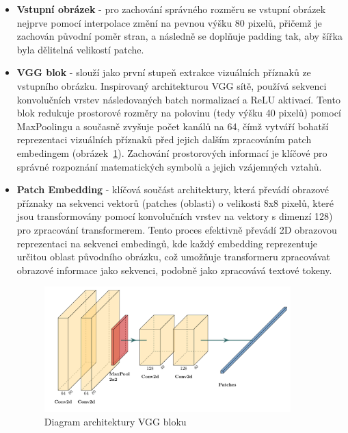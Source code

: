 \begin{itemize}
    \item \textbf{Vstupní obrázek} - pro zachování správného rozměru se vstupní obrázek nejprve pomocí interpolace změní na pevnou výšku 80 pixelů, přičemž je zachován původní poměr stran, a následně se doplňuje padding tak, aby šířka byla dělitelná velikostí patche.
    \item \textbf{VGG blok} - slouží jako první stupeň extrakce vizuálních příznaků ze vstupního obrázku. Inspirovaný architekturou VGG sítě, používá sekvenci konvolučních vrstev následovaných batch normalizací a ReLU aktivací. Tento blok redukuje prostorové rozměry na polovinu (tedy výšku 40 pixelů) pomocí MaxPoolingu a současně zvyšuje počet kanálů na 64, čímž vytváří bohatší reprezentaci vizuálních příznaků před jejich dalším zpracováním patch embedingem (obrázek~\ref{img:vgg_arch}). Zachování prostorových informací je klíčové pro správné rozpoznání matematických symbolů a jejich vzájemných vztahů.
    \item \textbf{Patch Embedding} - klíčová součást architektury, která převádí obrazové příznaky na sekvenci vektorů (patches (oblasti) o velikosti 8x8 pixelů, které jsou transformovány pomocí konvolučních vrstev na vektory s dimenzí 128) pro zpracování transformerem. Tento proces efektivně převádí 2D obrazovou reprezentaci na sekvenci embedingů, kde každý embedding reprezentuje určitou oblast původního obrázku, což umožňuje transformeru zpracovávat obrazové informace jako sekvenci, podobně jako zpracovává textové tokeny.

\begin{figure}[h!]
    \centering
    \includegraphics[width=0.9\textwidth]{img/vgg_architecture.pdf}
    \caption{Diagram architektury VGG bloku}
    \label{img:vgg_arch}
\end{figure}
    

\end{itemize}
